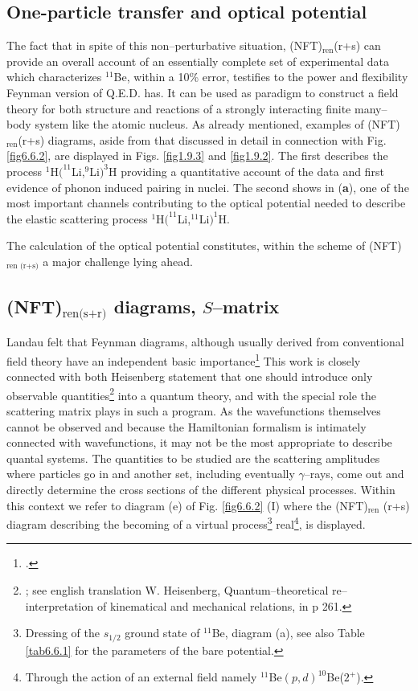 \subsection{One-particle transfer and optical potential}
The fact that in spite of this non--perturbative situation, (NFT)$_{\text{ren}}$(r+s) can provide an overall account of an essentially complete set of experimental data which characterizes $^{11}$Be, within a 10\% error, testifies to the power and flexibility Feynman version of Q.E.D. has. It can be used as paradigm to construct a field theory for both structure and reactions of a strongly interacting finite many--body system like the atomic nucleus. As already mentioned, examples of (NFT)$_{\text{ren}}$(r+s) diagrams, aside from that discussed in detail in connection with Fig. \ref{fig6.6.2}, are displayed in Figs. \ref{fig1.9.3} and \ref{fig1.9.2}. The first describes the process  $^1$H$(^{11}$Li,$^9$Li$)^3$H providing a quantitative account of the data and first evidence of phonon induced pairing in nuclei. The second shows in (\textbf{a}), one of the most important channels contributing to the optical potential needed to describe the elastic scattering process $^1$H$(^{11}$Li,$^{11}$Li$)^1$H. 
    	    	 
The calculation of the optical potential constitutes, within the scheme of (NFT)$_{\text{ren (r+s)}}$ a major challenge lying ahead.
\subsection{(NFT)$_{\text{ren(s+r)}}$ diagrams, $S$--matrix}\label{S6.6.2}
Landau felt that Feynman diagrams, although usually derived from conventional field theory have an independent basic importance\footnote{\cite{Landau:59}.} This work is closely connected with both Heisenberg statement that one should introduce only observable quantities\footnote{\cite{Heisenberg:25}; see english translation W. Heisenberg, Quantum--theoretical re--interpretation of kinematical and mechanical relations, in \cite{VanderWaerden:67} p 261.} into a quantum theory, and with the special role the scattering matrix plays in such a program. As the wavefunctions themselves cannot be observed and because the Hamiltonian formalism is intimately connected with wavefunctions, it may not be the most appropriate to describe quantal systems. The quantities to be studied are the scattering amplitudes where particles go in and another set, including eventually $\gamma$--rays, come out and directly determine the cross sections of the different physical processes.
Within this context we refer to diagram (e) of Fig. \ref{fig6.6.2} (I) where the (NFT)$_{\text{ren}}$ (r+s) diagram describing the becoming of a virtual process\footnote{Dressing of the $s_{1/2}$ ground state of $^{11}$Be, diagram (a), see also Table \ref{tab6.6.1} for the parameters of the bare potential.} real\footnote{Through the action of an external field namely $^{11}$Be$(p,d)^{10}$Be($2^+$).},  is displayed.  
 



